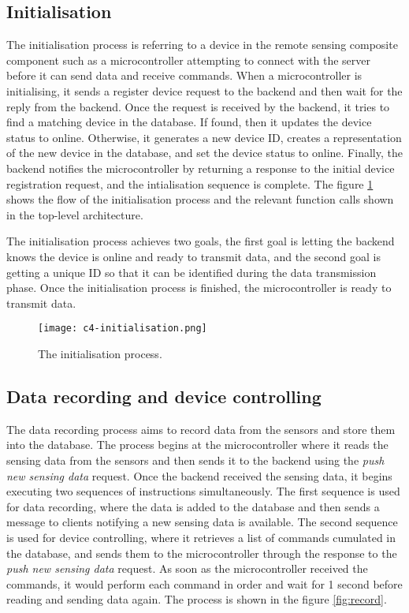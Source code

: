 \documentclass[../thesis.tex]{subfiles}
\begin{document}
\subsection{Initialisation}

The initialisation process is referring to a device in the remote sensing composite component such as a microcontroller attempting to connect with the server before it can send data and receive commands. When a microcontroller is initialising, it sends a register device request to the backend and then wait for the reply from the backend. Once the request is received by the backend, it tries to find a matching device in the database. If found, then it updates the device status to online. Otherwise, it generates a new device ID, creates a representation of the new device in the database, and set the device status to online. Finally, the backend notifies the microcontroller by returning a response to the initial device registration request, and the intialisation sequence is complete. The figure \ref{fig:init} shows the flow of the initialisation process and the relevant function calls shown in the top-level architecture.

The initialisation process achieves two goals, the first goal is letting the backend knows the device is online and ready to transmit data, and the second goal is getting a unique ID so that it can be identified during the data transmission phase. Once the initialisation process is finished, the microcontroller is ready to transmit data. 

\begin{figure}[!ht]
	\centering
	\texttt{[image: c4-initialisation.png]}
	\caption{The initialisation process.}
	\label{fig:init}
\end{figure}


\subsection{Data recording and device controlling}

The data recording process aims to record data from the sensors and store them into the database. The process begins at the microcontroller where it reads the sensing data from the sensors and then sends it to the backend using the \emph{push new sensing data} request. Once the backend received the sensing data, it begins executing two sequences of instructions simultaneously. The first sequence is used for data recording, where the data is added to the database and then sends a message to clients notifying a new sensing data is available. The second sequence is used for device controlling, where it retrieves a list of commands cumulated in the database, and sends them to the microcontroller through the response to the \emph{push new sensing data} request. As soon as the microcontroller received the commands, it would perform each command in order and wait for 1 second before reading and sending data again. The process is shown in the figure \ref{fig:record}. 
\end{document}
